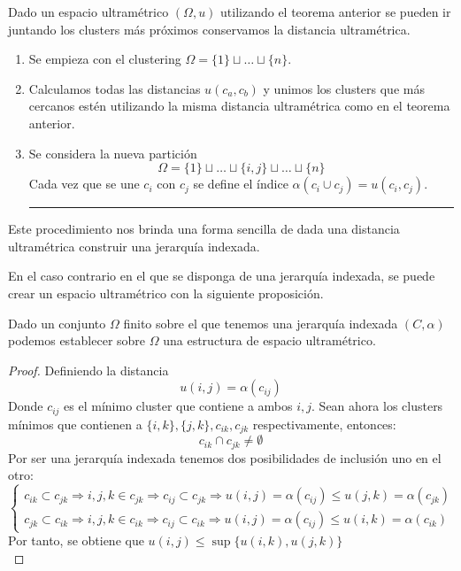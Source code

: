 \noindent Dado un espacio ultramétrico $(\Omega, u)$ utilizando el teorema anterior se pueden ir juntando los clusters más próximos conservamos la distancia ultramétrica. \\
\begin{enumerate}
\hrule
\item Se empieza con el clustering $\Omega= \lbrace 1\rbrace \sqcup \ldots \sqcup\lbrace n \rbrace$. 
\item Calculamos todas las distancias $u(c_a,c_b)$ y unimos los clusters que más cercanos estén utilizando la misma distancia ultramétrica como en el teorema anterior.
\item Se considera la nueva partición
\begin{equation}
\Omega= \lbrace 1\rbrace \sqcup\ldots \sqcup \lbrace i,j\rbrace \sqcup \ldots \sqcup\lbrace n \rbrace
\end{equation}
Cada vez que se une $c_i$ con $c_j$ se define el índice $\alpha(c_i\cup c_j)=u(c_i,c_j)$.\\
\hrule
\end{enumerate}


\noindent Este procedimiento nos brinda una forma sencilla de dada una distancia ultramétrica construir una jerarquía indexada. 

\noindent En el caso contrario en el que se disponga de una jerarquía indexada, se puede crear un espacio ultramétrico con la siguiente proposición. 
\begin{propo}
Dado un conjunto $\Omega$ finito sobre el que tenemos una jerarquía indexada $(C,\alpha)$ podemos establecer sobre $\Omega$ una estructura de espacio ultramétrico. 
\begin{proof}
Definiendo la distancia
\begin{equation}
u(i,j)=\alpha(c_{ij})
\end{equation}
Donde $c_{ij}$ es el mínimo cluster que contiene a ambos $i,j$. Sean ahora los clusters mínimos que contienen a $\lbrace i,k\rbrace,\lbrace j,k\rbrace, c_{ik},c_{jk}$ respectivamente, entonces:
\begin{equation}
c_{ik}\cap c_{jk}\neq \emptyset
\end{equation}
Por ser una jerarquía indexada tenemos dos posibilidades de inclusión uno en el otro:
\begin{equation}
\begin{cases}
c_{ik}\subset c_{jk}\Rightarrow i,j,k\in c_{jk}\Rightarrow c_{ij}\subset c_ {jk}\Rightarrow u(i,j)=\alpha(c_{ij})\leq u(j,k)=\alpha(c_{jk})\\
c_{jk}\subset c_{ik}\Rightarrow i,j,k\in c_{ik}\Rightarrow c_{ij}\subset c_ {ik}\Rightarrow u(i,j)=\alpha(c_{ij})\leq u(i,k)=\alpha(c_{ik})
\end{cases}
\end{equation}
Por tanto, se obtiene que $u(i,j)\leq \sup\lbrace u(i,k),u(j,k) \rbrace$\\
\qedhere
\end{proof}
\end{propo}

